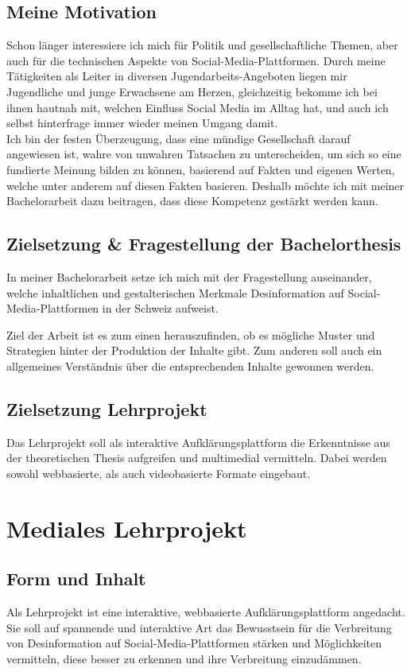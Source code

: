 \documentclass[12pt,a4paper]{article}        %
\begin{document}
\subsection{Meine Motivation}

Schon länger interessiere ich mich für Politik und gesellschaftliche Themen, aber auch für die technischen Aspekte von Social-Media-Plattformen. Durch meine Tätigkeiten als Leiter in diversen Jugendarbeits-Angeboten liegen mir Jugendliche und junge Erwachsene am Herzen, gleichzeitig bekomme ich bei ihnen hautnah mit, welchen Einfluss Social Media im Alltag hat, und auch ich selbst hinterfrage immer wieder meinen Umgang damit. \\
Ich bin der festen Überzeugung, dass eine mündige Gesellschaft darauf angewiesen ist, wahre von unwahren Tatsachen zu unterscheiden, um sich so eine fundierte Meinung bilden zu können, basierend auf Fakten und eigenen Werten, welche unter anderem auf diesen Fakten basieren. Deshalb möchte ich mit meiner Bachelorarbeit dazu beitragen, dass diese Kompetenz gestärkt werden kann.

\subsection{Zielsetzung \& Fragestellung der Bachelorthesis}
In meiner Bachelorarbeit setze ich mich mit der Fragestellung auseinander, welche inhaltlichen und gestalterischen Merkmale Desinformation auf Social-Media-Plattformen in der Schweiz aufweist. 

Ziel der Arbeit ist es zum einen herauszufinden, ob es mögliche Muster und Strategien hinter der Produktion der Inhalte gibt. Zum anderen soll auch ein allgemeines Verständnis über die entsprechenden Inhalte gewonnen werden.

\subsection{Zielsetzung Lehrprojekt}
Das Lehrprojekt soll als interaktive Aufklärungsplattform die Erkenntnisse aus der theoretischen Thesis aufgreifen und multimedial vermitteln. Dabei werden sowohl webbasierte, als auch videobasierte Formate eingebaut. \\

\section{Mediales Lehrprojekt}
\subsection{Form und Inhalt}
Als Lehrprojekt ist eine interaktive, webbasierte Aufklärungsplattform angedacht. Sie soll auf spannende und interaktive Art das Bewusstsein für die Verbreitung von Desinformation auf Social-Media-Plattformen stärken und Möglichkeiten vermitteln, diese besser zu erkennen und ihre Verbreitung einzudämmen.\\
\end{document}
